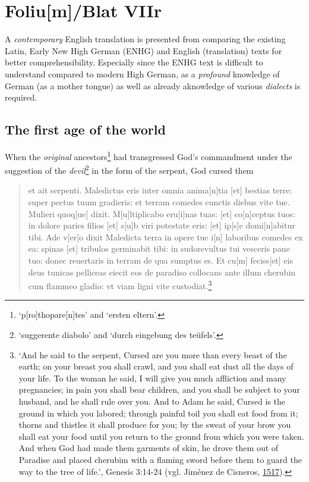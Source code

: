 \documentclass[
]{article}
\author{Dietmar Gerald Schrausser}
\date{09.05.2026}
\begin{document}
\hypertarget{foliumblat-viir}{%
\section{Foliu{[}m{]}/Blat VIIr}\label{foliumblat-viir}}

A \emph{contemporary} English translation is presented from comparing
the existing Latin, Early New High German (ENHG) and English
(translation) texts for better comprehensibility. Especially since the
ENHG text is difficult to understand compared to modern High German, as
a \emph{profound} knowledge of German (as a mother tongue) as well as
already aknowledge of various \emph{dialects} is required.

\hypertarget{the-first-age-of-the-world}{%
\subsection{The first age of the
world}\label{the-first-age-of-the-world}}

When the \emph{original} ancestors\footnote{`p{[}ro{]}thopare{[}n{]}tes'
  and `ersten eltern'.} had transgressed God's commandment under the
suggestion of the \emph{devil}\footnote{`suggerente diabolo' and `durch
  eingebung des teüfels'.} in the form of the serpent, God cursed them

\begin{quote}
et ait serpenti. Maledictus eris inter omnia anima{[}n{]}tia {[}et{]}
bestias terre: super pectus tuum gradieris: et terram comedes cunctis
diebus vite tue. Mulieri quoq{[}ue{[} dixit. M{[}u{]}ltiplicabo
eru{[}i{]}nas tuas: {[}et{]} co{[}n{]}ceptus tuos: in dolore paries
filios {[}et{]} s{[}u{]}b viri potestate eris: {[}et{]} ip{[}s{]}e
domi{[}n{]}abitur tibi. Ade v{[}er{]}o dixit Maledicta terra in opere
tue i{[}n{]} laboribus comedes ex ea: spinas {[}et{]} tribulos
germinabit tibi: in sudorevultus tui vesceris pane tuo: donec reuertaris
in terram de qua sumptus es. Et cu{[}m{]} feciss{[}et{]} eis deus
tunicas pelliceas eiecit eos de paradiso collocans ante illum cherubin
cum flammeo gladio: vt viam ligni vite custodiat.\footnote{`And he said
  to the serpent, Cursed are you more than every beast of the earth; on
  your breast you shall crawl, and you shall eat dust all the days of
  your life. To the woman he said, I will give you much affliction and
  many pregnancies; in pain you shall bear children, and you shall be
  subject to your husband, and he shall rule over you. And to Adam he
  said, Cursed is the ground in which you labored; through painful toil
  you shall eat food from it; thorns and thistles it shall produce for
  you; by the sweat of your brow you shall eat your food until you
  return to the ground from which you were taken. And when God had made
  them garments of skin, he drove them out of Paradise and placed
  cherubim with a flaming sword before them to guard the way to the tree
  of life.', Genesis 3:14-24 (vgl. Jiménez de Cisneros,
  \href{https://doi.org/10.3931/e-rara-46695}{1517}).}
\end{quote}
\end{document}
